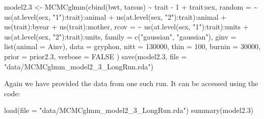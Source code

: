 \documentclass[
  12pt,
]{book}
\newenvironment{Shaded}{\begin{snugshade}}{\end{snugshade}}
\newcommand{\AttributeTok}[1]{\textcolor[rgb]{0.77,0.63,0.00}{#1}}
\newcommand{\ConstantTok}[1]{\textcolor[rgb]{0.00,0.00,0.00}{#1}}
\newcommand{\DecValTok}[1]{\textcolor[rgb]{0.00,0.00,0.81}{#1}}
\newcommand{\FloatTok}[1]{\textcolor[rgb]{0.00,0.00,0.81}{#1}}
\newcommand{\FunctionTok}[1]{\textcolor[rgb]{0.00,0.00,0.00}{#1}}
\newcommand{\NormalTok}[1]{#1}
\newcommand{\OtherTok}[1]{\textcolor[rgb]{0.56,0.35,0.01}{#1}}
\newcommand{\SpecialCharTok}[1]{\textcolor[rgb]{0.00,0.00,0.00}{#1}}
\newcommand{\StringTok}[1]{\textcolor[rgb]{0.31,0.60,0.02}{#1}}
\begin{document}
\begin{Shaded}
\begin{Highlighting}[]
\NormalTok{model2}\FloatTok{.3} \OtherTok{\textless{}{-}} \FunctionTok{MCMCglmm}\NormalTok{(}\FunctionTok{cbind}\NormalTok{(bwt, tarsus) }\SpecialCharTok{\textasciitilde{}}\NormalTok{ trait }\SpecialCharTok{{-}} \DecValTok{1} \SpecialCharTok{+}\NormalTok{ trait}\SpecialCharTok{:}\NormalTok{sex,}
  \AttributeTok{random =} \SpecialCharTok{\textasciitilde{}} \FunctionTok{us}\NormalTok{(}\FunctionTok{at.level}\NormalTok{(sex, }\StringTok{"1"}\NormalTok{)}\SpecialCharTok{:}\NormalTok{trait)}\SpecialCharTok{:}\NormalTok{animal }\SpecialCharTok{+} \FunctionTok{us}\NormalTok{(}\FunctionTok{at.level}\NormalTok{(sex, }\StringTok{"2"}\NormalTok{)}\SpecialCharTok{:}\NormalTok{trait)}\SpecialCharTok{:}\NormalTok{animal }\SpecialCharTok{+} \FunctionTok{us}\NormalTok{(trait)}\SpecialCharTok{:}\NormalTok{byear }\SpecialCharTok{+} \FunctionTok{us}\NormalTok{(trait)}\SpecialCharTok{:}\NormalTok{mother,}
  \AttributeTok{rcov =} \SpecialCharTok{\textasciitilde{}} \FunctionTok{us}\NormalTok{(}\FunctionTok{at.level}\NormalTok{(sex, }\StringTok{"1"}\NormalTok{)}\SpecialCharTok{:}\NormalTok{trait)}\SpecialCharTok{:}\NormalTok{units }\SpecialCharTok{+} \FunctionTok{us}\NormalTok{(}\FunctionTok{at.level}\NormalTok{(sex, }\StringTok{"2"}\NormalTok{)}\SpecialCharTok{:}\NormalTok{trait)}\SpecialCharTok{:}\NormalTok{units,}
  \AttributeTok{family =} \FunctionTok{c}\NormalTok{(}\StringTok{"gaussian"}\NormalTok{, }\StringTok{"gaussian"}\NormalTok{),}
  \AttributeTok{ginv =} \FunctionTok{list}\NormalTok{(}\AttributeTok{animal =}\NormalTok{ Ainv), }\AttributeTok{data =}\NormalTok{ gryphon,}
  \AttributeTok{nitt =} \DecValTok{130000}\NormalTok{, }\AttributeTok{thin =} \DecValTok{100}\NormalTok{, }\AttributeTok{burnin =} \DecValTok{30000}\NormalTok{,}
  \AttributeTok{prior =}\NormalTok{ prior2}\FloatTok{.3}\NormalTok{, }\AttributeTok{verbose =} \ConstantTok{FALSE}
\NormalTok{)}
\FunctionTok{save}\NormalTok{(model2}\FloatTok{.3}\NormalTok{, }\AttributeTok{file =} \StringTok{"data/MCMCglmm\_model2\_3\_LongRun.rda"}\NormalTok{)}
\end{Highlighting}
\end{Shaded}

Again we have provided the data from one such run. It can be accessed using the code:

\begin{Shaded}
\begin{Highlighting}[]
\FunctionTok{load}\NormalTok{(}\AttributeTok{file =} \StringTok{"data/MCMCglmm\_model2\_3\_LongRun.rda"}\NormalTok{)}
\FunctionTok{summary}\NormalTok{(model2}\FloatTok{.3}\NormalTok{)}
\end{Highlighting}
\end{Shaded}
\end{document}
